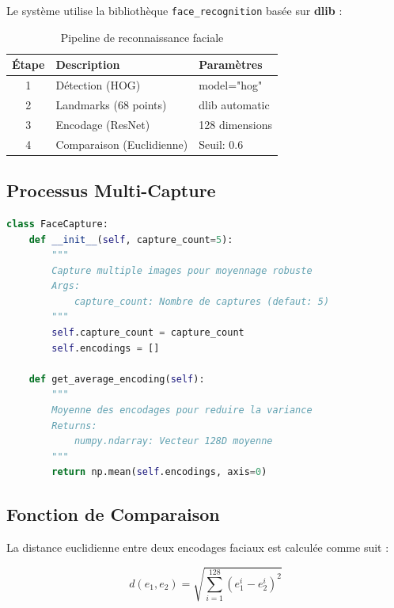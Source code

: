 \documentclass[12pt,a4paper]{report}
\begin{document}
Le système utilise la bibliothèque \texttt{face\_recognition} basée sur \textbf{dlib} :

\begin{table}[H]
    \centering
    \caption{Pipeline de reconnaissance faciale}
    \label{tab:face-pipeline}
    \begin{tabular}{|c|l|l|}
        \hline
        \textbf{Étape} & \textbf{Description} & \textbf{Paramètres} \\
        \hline
        1 & Détection (HOG) & model="hog" \\
        \hline
        2 & Landmarks (68 points) & dlib automatic \\
        \hline
        3 & Encodage (ResNet) & 128 dimensions \\
        \hline
        4 & Comparaison (Euclidienne) & Seuil: 0.6 \\
        \hline
    \end{tabular}
\end{table}

\subsection{Processus Multi-Capture}

\begin{lstlisting}[caption={Classe FaceCapture},language=Python]
class FaceCapture:
    def __init__(self, capture_count=5):
        """
        Capture multiple images pour moyennage robuste
        Args:
            capture_count: Nombre de captures (defaut: 5)
        """
        self.capture_count = capture_count
        self.encodings = []
    
    def get_average_encoding(self):
        """
        Moyenne des encodages pour reduire la variance
        Returns:
            numpy.ndarray: Vecteur 128D moyenne
        """
        return np.mean(self.encodings, axis=0)
\end{lstlisting}

\subsection{Fonction de Comparaison}

La distance euclidienne entre deux encodages faciaux est calculée comme suit :

\begin{equation}
    d(e_1, e_2) = \sqrt{\sum_{i=1}^{128} (e_1^i - e_2^i)^2}
    \label{eq:euclidean}
\end{equation}
\end{document}
